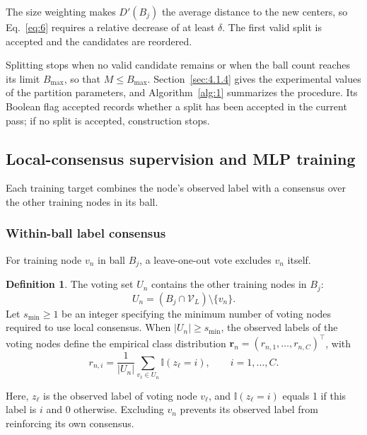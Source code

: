 \documentclass[times,review,10pt]{elsarticle}
\theoremstyle{definition}
\newtheorem{definition}{Definition}
\theoremstyle{plain}
\begin{document}
The size weighting makes \(D'(B_j)\) the average distance to the new centers, so Eq.~\eqref{eq:6} requires a relative decrease of at least \(\delta\). The first valid split is accepted and the candidates are reordered.

Splitting stops when no valid candidate remains or when the ball count reaches its limit \(B_{\max}\), so that \(M\leq B_{\max}\). Section~\ref{sec:4.1.4} gives the experimental values of the partition parameters, and Algorithm~\ref{alg:1} summarizes the procedure. Its Boolean flag \(\mathrm{accepted}\) records whether a split has been accepted in the current pass; if no split is accepted, construction stops.



\subsection{Local-consensus supervision and MLP training}\label{sec:3.3}

Each training target combines the node's observed label with a consensus over the other training nodes in its ball.

\subsubsection{Within-ball label consensus}\label{sec:3.3.1}

For training node \(v_n\) in ball \(B_j\), a leave-one-out vote excludes \(v_n\) itself.

\begin{definition}
The voting set \(U_n\) contains the other training nodes in \(B_j\):
\begin{equation}\label{eq:7}
U_n=(B_j\cap\mathcal V_L)\setminus\{v_n\}.
\end{equation}
Let \(s_{\min}\geq1\) be an integer specifying the minimum number of voting nodes required to use local consensus. When \(|U_n|\geq s_{\min}\), the observed labels of the voting nodes define the empirical class distribution \(\mathbf r_n=(r_{n,1},\ldots,r_{n,C})^\top\), with
\begin{equation}\label{eq:8}
r_{n,i}=\frac{1}{|U_n|}\sum_{v_\ell\in U_n}\mathbb I(z_\ell=i),
\qquad i=1,\ldots,C.
\end{equation}
\end{definition}

Here, \(z_\ell\) is the observed label of voting node \(v_\ell\), and \(\mathbb I(z_\ell=i)\) equals 1 if this label is \(i\) and 0 otherwise. Excluding \(v_n\) prevents its observed label from reinforcing its own consensus.
\end{document}
